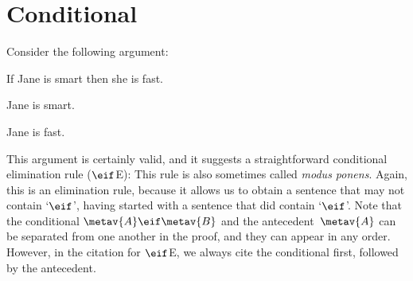 \section{Conditional}
Consider the following argument:
\begin{earg}
		\item[] If Jane is smart then she is fast.
		\item[] Jane is smart.
		\item[\therefore] Jane is fast.
\end{earg}
This argument is certainly valid, and it suggests a straightforward conditional elimination rule ($\eif$E):
This rule is also sometimes called \emph{modus ponens}. Again, this is an elimination rule, because it allows us to obtain a sentence that may not contain `$\eif$', having started with a sentence that did contain `$\eif$'. Note that the conditional $\metav{A}\eif\metav{B}$ and the antecedent~$\metav{A}$ can be separated from one another in the proof, and they can appear in any order. However, in the citation for $\eif$E, we always cite the conditional first, followed by the antecedent.

